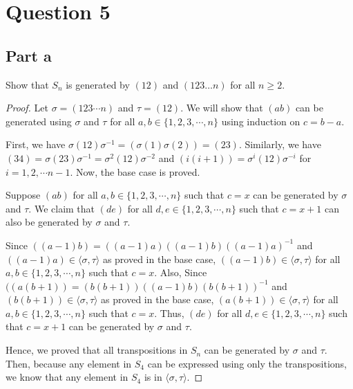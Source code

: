 \section{Question 5}

\subsection{Part a}

\begin{question}
    Show that $S_n$ is generated by $(12)$ and $(123 \ldots n)$ for all $n \geq 2$.
\end{question}

\begin{answer}
    \begin{proof}
        Let $\sigma = (123\cdots n)$ and $\tau = (12)$. We will show that $(ab)$ can be generated using $\sigma$ and $\tau$ for all $a,b \in \{1,2,3,\cdots,n\}$ using induction on $c = b-a$.

        First, we have $\sigma (12) \sigma^{-1} = (\sigma(1)\sigma(2)) = (23)$. Similarly, we have $(34) = \sigma (23) \sigma^{-1} = \sigma^2(12)\sigma^{-2}$ and $(i(i+1)) = \sigma^{i}(12)\sigma^{-i}$ for $i = 1,2, \cdots n-1$. Now, the base case is proved.
        
        Suppose $(ab)$ for all $a,b \in \{1,2,3,\cdots,n\}$ such that $c = x$ can be generated by $\sigma$ and $\tau$. We claim that $(de)$ for all $d,e \in \{1,2,3,\cdots,n\}$ such that $c = x+1$ can also be generated by $\sigma$ and $\tau$.
        
        Since $((a-1)b) = ((a-1)a)((a-1)b)((a-1)a)^{-1}$ and $((a-1)a) \in \langle \sigma, \tau \rangle$ as proved in the base case, $((a-1)b) \in \langle \sigma, \tau \rangle$ for all $a,b \in \{1,2,3,\cdots,n\}$ such that $c = x$. Also, Since $((a(b+1)) = (b(b+1))((a-1)b)(b(b+1))^{-1}$ and $(b(b+1)) \in \langle \sigma, \tau \rangle$ as proved in the base case, $(a(b+1)) \in \langle \sigma, \tau \rangle$ for all $a,b \in \{1,2,3,\cdots,n\}$ such that $c = x$. Thus, $(de)$ for all $d,e \in \{1,2,3,\cdots,n\}$ such that $c = x+1$ can be generated by $\sigma$ and $\tau$.
        
        Hence, we proved that all transpositions in $S_n$ can be generated by $\sigma$ and $\tau$. Then, because any element in $S_4$ can be expressed using only the transpositions, we know that any element in $S_4$ is in $\langle \sigma, \tau \rangle$.
    \end{proof}
\end{answer}


